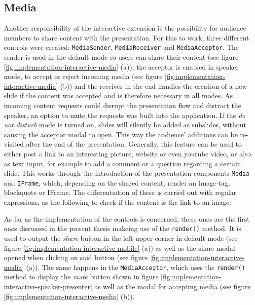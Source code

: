 \subsection{Media}
\label{sec:implementation-interactive-media}
Another responsibility of the interactive extension is the possibility for audience members to share content with the presentation. For this to work, three different controls were created: \texttt{MediaSender}, \texttt{MediaReceiver} and \texttt{MediaAcceptor}. The sender is used in the default mode so users can share their content (see figure \ref{fig:implementation-interactive-media} (a)), the acceptor is enabled in speaker mode, to accept or reject incoming media (see figure \ref{fig:implementation-interactive-media} (b)) and the receiver in the end handles the creation of a new slide if the content was accepted and is therefore necessary in all modes. As incoming content requests could disrupt the presentation flow and distract the speaker, an option to mute the requests was built into the application. If the \emph{do not disturb} mode is turned on, slides will silently be added as subslides, without causing the acceptor modal to open. This way the audience' additions can be re-visited after the end of the presentation. Generally, this feature can be used to either post a link to an interesting picture, website or even youtube video, or also as text input, for example to add a comment or a question regarding a certain slide. This works through the introduction of the presentation components \texttt{Media} and \texttt{IFrame}, which, depending on the shared content, render an image-tag, blockquote or IFrame. The differentiation of these is carried out with regular expressions, as the following to check if the content is the link to an image:

As far as the implementation of the controls is concerned, these ones are the first ones discussed in the present thesis makeing use of the \texttt{render()} method. It is used to output the \emph{share} button in the left upper corner in default mode (see figure \ref{fig:implementation-interactive-mobile} (a)) as well as the share modal opened when clicking on said button (see figure \ref{fig:implementation-interactive-media} (a)). The same happens in the \texttt{MediaAcceptor}, which uses the \texttt{render()} method to display the \emph{mute} button shown in figure \ref{fig:implementation-interactive-speaker-presenter} as well as the modal for accepting media (see figure \ref{fig:implementation-interactive-media} (b)).

